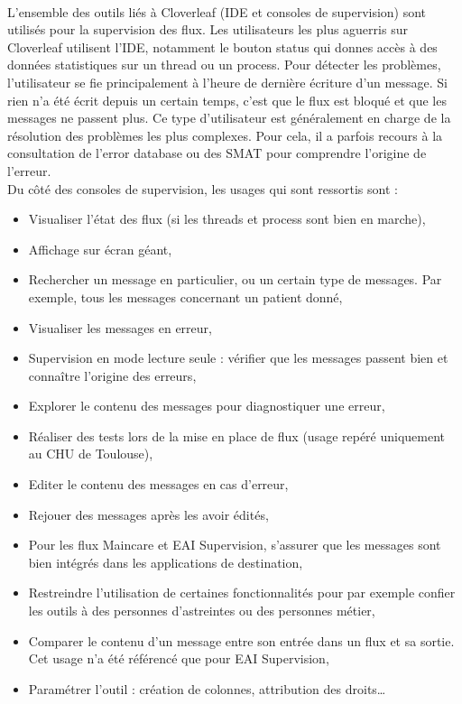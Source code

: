 			\paragraph{}%
			L’ensemble des outils liés à Cloverleaf (IDE et consoles de supervision) sont
			utilisés pour la supervision des flux. Les utilisateurs les plus aguerris
			sur Cloverleaf utilisent l’IDE, notamment le bouton status qui donnes accès
			à des données statistiques sur un thread ou un process. Pour détecter les
			problèmes, l’utilisateur se fie principalement à l’heure de dernière
			écriture d’un message. Si rien n’a été écrit depuis un certain temps, c’est
			que le flux est bloqué et que les messages ne passent plus. Ce type
			d’utilisateur est généralement en charge de la résolution des problèmes les
			plus complexes. Pour cela, il a parfois recours à la consultation de l’error
			database ou des SMAT pour comprendre l’origine de l’erreur.\\
			Du côté des consoles de supervision, les usages qui sont ressortis sont :
			\begin{itemize}
			  \item Visualiser l’état des flux (si les threads et process sont bien en
			  marche),
			  \item Affichage sur écran géant,
			  \item Rechercher un message en particulier, ou un certain type de
			  messages. Par exemple, tous les messages concernant un patient donné,
			  \item Visualiser les messages en erreur,
			  \item Supervision en mode lecture seule : vérifier que les messages
			  passent bien et connaître l’origine des erreurs,
			  \item Explorer le contenu des messages pour diagnostiquer une erreur,
			  \item Réaliser des tests lors de la mise en place de flux (usage repéré
			  uniquement au CHU de Toulouse),
			  \item Editer le contenu des messages en cas d’erreur,
			  \item Rejouer des messages après les avoir édités,
			  \item Pour les flux Maincare et EAI Supervision, s’assurer que les
			  messages sont bien intégrés dans les applications de destination,
			  \item Restreindre l’utilisation de certaines fonctionnalités pour par
			  exemple confier les outils à des personnes d’astreintes ou des personnes
			  métier,
			  \item Comparer le contenu d’un message entre son entrée dans un flux et
			  sa sortie. Cet usage n’a été référencé que pour EAI Supervision,
			  \item Paramétrer l’outil : création de colonnes, attribution des droits…
			\end{itemize}

